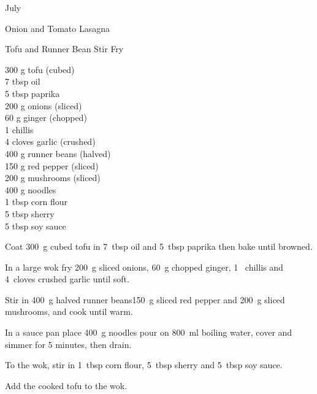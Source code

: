 \begin{menu}{July}
\begin{recipe}{2}{Onion and Tomato Lasagna}
\begin{instructions}
    \end{instructions}
    \end{recipe}%
  
    \begin{recipe}{2}{Tofu and Runner Bean Stir Fry}%
		\begin{ingredients}
		300 g tofu (cubed) \\
	7 tbsp oil  \\
	5 tbsp paprika  \\
	200 g onions (sliced) \\
	60 g ginger (chopped) \\
	1  chillis  \\
	4 cloves garlic (crushed) \\
	400 g runner beans (halved) \\
	150 g red pepper (sliced) \\
	200 g mushrooms (sliced) \\
	400 g noodles  \\
	1 tbsp corn flour  \\
	5 tbsp sherry  \\
	5 tbsp soy sauce  \\
	
		\end{ingredients}
	
	
    \begin{instructions}
    \item 
        Coat
        300~g cubed tofu
        in
        7~tbsp  oil
        and
        5~tbsp  paprika
        then bake until browned.
      \item 
        In a large wok fry 200~g sliced onions,
        60~g chopped ginger,
        1~  chillis
        and
        4~cloves crushed garlic
        until soft.
      \item 
        Stir in
        400~g halved runner beans150~g sliced red pepper
        and
        200~g sliced mushrooms,
        and cook until warm.
      \item 
      In a 
      sauce pan
      place
      400~g  noodles
      pour on
      800~ml  boiling water,
      cover and simmer for 5 minutes, then drain.
    \item 
        To the wok, stir in
        1~tbsp  corn flour,
        5~tbsp  sherry
        and
        5~tbsp  soy sauce.
      \item 
        Add the cooked tofu to the wok.
      

\end{instructions}
\end{recipe}
\end{menu}
